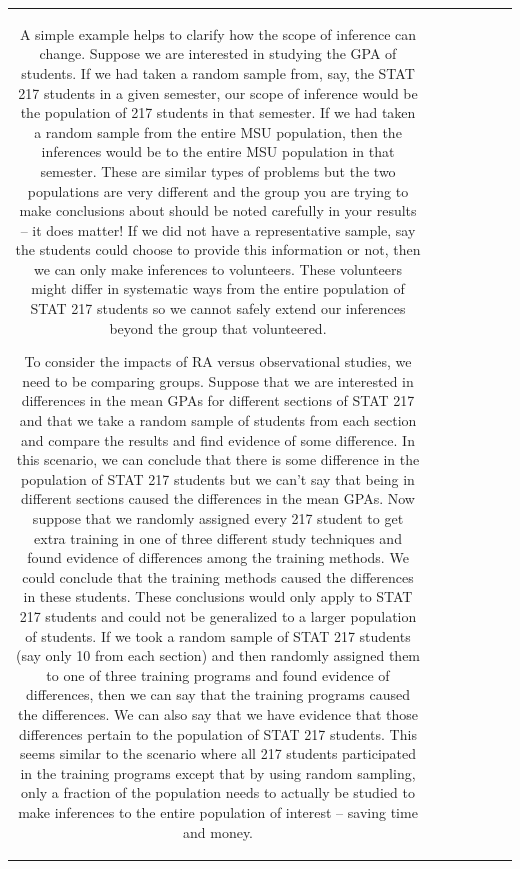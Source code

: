\documentclass[]{book}
\theoremstyle{definition}
\theoremstyle{definition}
\theoremstyle{remark}
\begin{document}
\begin{longtable}[]{@{}ccccccc@{}}
\begin{minipage}[b]{0.10\columnwidth}
\normalsize

A simple example helps to clarify how the scope of inference can change.
Suppose we are interested in studying the GPA of students. If we had
taken a random sample from, say, the STAT 217 students in a given
semester, our scope of inference would be the population of 217 students
in that semester. If we had taken a random sample from the entire MSU
population, then the inferences would be to the entire MSU population in
that semester. These are similar types of problems but the two
populations are very different and the group you are trying to make
conclusions about should be noted carefully in your results -- it does
matter! If we did not have a representative sample, say the students
could choose to provide this information or not, then we can only make
inferences to volunteers. These volunteers might differ in systematic
ways from the entire population of STAT 217 students so we cannot safely
extend our inferences beyond the group that volunteered.

To consider the impacts of RA versus observational studies, we need to
be comparing groups. Suppose that we are interested in differences in
the mean GPAs for different sections of STAT 217 and that we take a
random sample of students from each section and compare the results and
find evidence of some difference. In this scenario, we can conclude that
there is some difference in the population of STAT 217 students but we
can't say that being in different sections caused the differences in the
mean GPAs. Now suppose that we randomly assigned every 217 student to
get extra training in one of three different study techniques and found
evidence of differences among the training methods. We could conclude
that the training methods caused the differences in these students.
These conclusions would only apply to STAT 217 students and could not be
generalized to a larger population of students. If we took a random
sample of STAT 217 students (say only 10 from each section) and then
randomly assigned them to one of three training programs and found
evidence of differences, then we can say that the training programs
caused the differences. We can also say that we have evidence that those
differences pertain to the population of STAT 217 students. This seems
similar to the scenario where all 217 students participated in the
training programs except that by using random sampling, only a fraction
of the population needs to actually be studied to make inferences to the
entire population of interest -- saving time and money.


\end{minipage}
\end{longtable}
\end{document}
